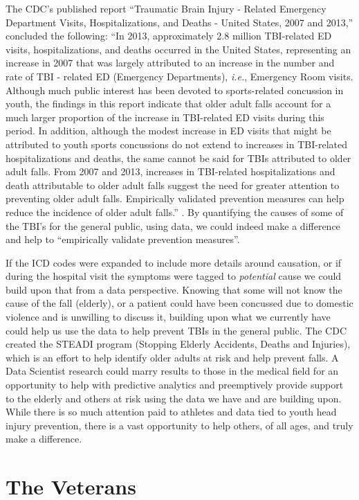 \documentclass[sigconf]{acmart}
\begin{document}
The CDC's published report ``Traumatic Brain Injury - Related Emergency Department Visits, Hospitalizations, and Deaths - United States, 2007 and 2013,'' concluded the following: ``In 2013, approximately 2.8 million TBI-related ED visits, hospitalizations, and deaths occurred in the United States, representing an increase in 2007 that was largely attributed to an increase in the number and rate of TBI - related ED (Emergency Departments), {\em i.e.}, Emergency Room visits.  Although much public interest has been devoted to sports-related concussion in youth, the findings in this report indicate that older adult falls account for a much larger proportion of the increase in TBI-related ED visits during this period.  In addition, although the modest increase in ED visits that might be attributed to youth sports concussions do not extend to increases in TBI-related hospitalizations and deaths, the same cannot be said for TBIs attributed to older adult falls.  From 2007 and 2013, increases in TBI-related hospitalizations and death attributable to older adult falls suggest the need for greater attention to preventing older adult falls.  Empirically validated prevention measures can help reduce the incidence of older adult falls.'' \cite{www-cdc-gov}.  By quantifying the causes of some of the TBI's for the general public, using data, we could indeed make a difference and help to ``empirically validate prevention measures''.

If the ICD codes were expanded to include more details around causation, or if during the hospital visit the symptoms were tagged to {\em potential} cause we could build upon that from a data perspective.  Knowing that some will not know the cause of the fall (elderly), or a patient could have been concussed due to domestic violence and is unwilling to discuss it, building upon what we currently have could help us use the data to help prevent TBIs in the general public.  The CDC created the STEADI program (Stopping Elderly Accidents, Deaths and Injuries), which is an effort to help identify older adults at risk and help prevent falls.  A Data Scientist research could marry results to those in the medical field for an opportunity to help with predictive analytics and preemptively provide support to the elderly and others at risk using the data we have and are building upon.  While there is so much attention paid to athletes and data tied to youth head injury prevention, there is a vast opportunity to help others, of all ages, and truly make a difference.  

\section{The Veterans}
\end{document}
